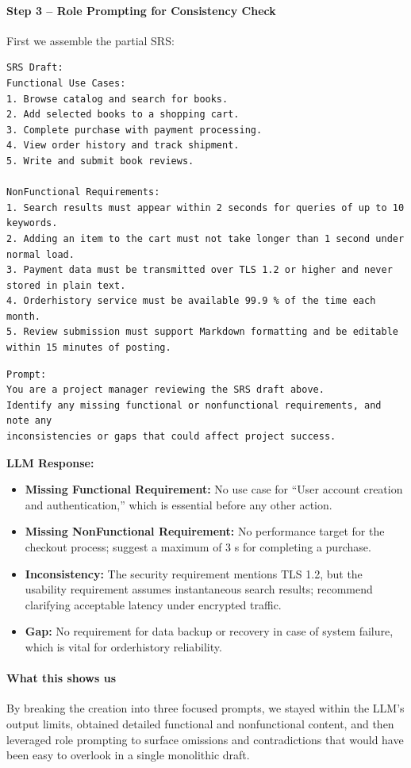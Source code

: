 \documentclass[12pt, a4paper]{article}
\begin{document}
\paragraph{Step 3 -- Role Prompting for Consistency Check}
First we assemble the partial SRS:

\begin{verbatim}
SRS Draft:
Functional Use Cases:
1. Browse catalog and search for books.
2. Add selected books to a shopping cart.
3. Complete purchase with payment processing.
4. View order history and track shipment.
5. Write and submit book reviews.

NonFunctional Requirements:
1. Search results must appear within 2 seconds for queries of up to 10 keywords.
2. Adding an item to the cart must not take longer than 1 second under normal load.
3. Payment data must be transmitted over TLS 1.2 or higher and never stored in plain text.
4. Orderhistory service must be available 99.9 % of the time each month.
5. Review submission must support Markdown formatting and be editable within 15 minutes of posting.
\end{verbatim}

\begin{verbatim}
Prompt:
You are a project manager reviewing the SRS draft above.  
Identify any missing functional or nonfunctional requirements, and note any
inconsistencies or gaps that could affect project success.
\end{verbatim}
\textbf{LLM Response:}
\begin{itemize}
  \item \textbf{Missing Functional Requirement:} No use case for ``User account creation and authentication,'' which is essential before any other action.  
  \item \textbf{Missing NonFunctional Requirement:} No performance target for the checkout process; suggest a maximum of 3 s for completing a purchase.  
  \item \textbf{Inconsistency:} The security requirement mentions TLS 1.2, but the usability requirement assumes instantaneous search results; recommend clarifying acceptable latency under encrypted traffic.  
  \item \textbf{Gap:} No requirement for data backup or recovery in case of system failure, which is vital for orderhistory reliability.
\end{itemize}

\paragraph{What this shows us}
By breaking the creation into three focused prompts, we stayed within the LLM's output limits, obtained detailed functional and nonfunctional content, and then leveraged role prompting to surface omissions and contradictions that would have been easy to overlook in a single monolithic draft.
\end{document}
